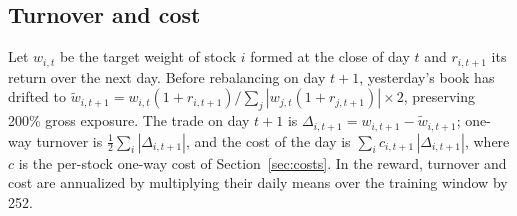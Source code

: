 \documentclass[preprint,12pt,authoryear]{elsarticle}
\begin{document}
\subsection{Turnover and cost}\label{app:turnover}

Let $w_{i,t}$ be the target weight of stock $i$ formed at the close of day $t$ and $r_{i,t+1}$ its return over the next day. Before rebalancing on day $t+1$, yesterday's book has drifted to $\tilde w_{i,t+1} = w_{i,t}(1+r_{i,t+1}) / \sum_j |w_{j,t}(1+r_{j,t+1})| \times 2$, preserving 200\% gross exposure. The trade on day $t+1$ is $\Delta_{i,t+1} = w_{i,t+1} - \tilde w_{i,t+1}$; one-way turnover is $\tfrac{1}{2}\sum_i |\Delta_{i,t+1}|$, and the cost of the day is $\sum_i c_{i,t+1}\,|\Delta_{i,t+1}|$, where $c$ is the per-stock one-way cost of Section~\ref{sec:costs}. In the reward, turnover and cost are annualized by multiplying their daily means over the training window by 252.
\end{document}
